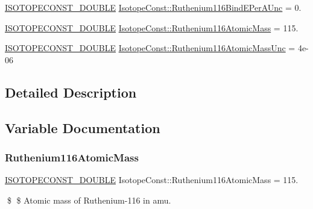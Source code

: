 \begin{DoxyCompactItemize}
\mbox{\hyperlink{group___isotope_const-_macros_ga8f45a7272ce02c0b4c65c44636ed719a}{I\+S\+O\+T\+O\+P\+E\+C\+O\+N\+S\+T\+\_\+\+D\+O\+U\+B\+LE}} \mbox{\hyperlink{group___isotope_const-_ruthenium-_ru116_gad9827ee3decf233e66b58081dc1f395a}{Isotope\+Const\+::\+Ruthenium116\+Bind\+E\+Per\+A\+Unc}} = 0.
\item 
\mbox{\hyperlink{group___isotope_const-_macros_ga8f45a7272ce02c0b4c65c44636ed719a}{I\+S\+O\+T\+O\+P\+E\+C\+O\+N\+S\+T\+\_\+\+D\+O\+U\+B\+LE}} \mbox{\hyperlink{group___isotope_const-_ruthenium-_ru116_ga799df1d6201c63d06b3cc8e99061ad6f}{Isotope\+Const\+::\+Ruthenium116\+Atomic\+Mass}} = 115.
\item 
\mbox{\hyperlink{group___isotope_const-_macros_ga8f45a7272ce02c0b4c65c44636ed719a}{I\+S\+O\+T\+O\+P\+E\+C\+O\+N\+S\+T\+\_\+\+D\+O\+U\+B\+LE}} \mbox{\hyperlink{group___isotope_const-_ruthenium-_ru116_gae322d921ec281becc7720807082c2526}{Isotope\+Const\+::\+Ruthenium116\+Atomic\+Mass\+Unc}} = 4e-\/06
\end{DoxyCompactItemize}


\subsection{Detailed Description}


\subsection{Variable Documentation}
\mbox{\label{group___isotope_const-_ruthenium-_ru116_ga799df1d6201c63d06b3cc8e99061ad6f}} 
\subsubsection{\texorpdfstring{Ruthenium116\+Atomic\+Mass}{Ruthenium116AtomicMass}}
{\footnotesize\ttfamily \mbox{\hyperlink{group___isotope_const-_macros_ga8f45a7272ce02c0b4c65c44636ed719a}{I\+S\+O\+T\+O\+P\+E\+C\+O\+N\+S\+T\+\_\+\+D\+O\+U\+B\+LE}} Isotope\+Const\+::\+Ruthenium116\+Atomic\+Mass = 115.}

\$ \$ Atomic mass of Ruthenium-\/116 in amu. \mbox{\label{group___isotope_const-_ruthenium-_ru116_gae322d921ec281becc7720807082c2526}} 
